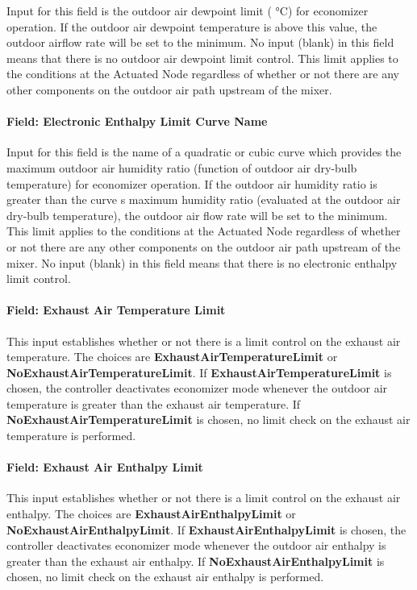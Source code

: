 Input for this field is the outdoor air dewpoint limit ( °C) for economizer operation. If the outdoor air dewpoint temperature is above this value, the outdoor airflow rate will be set to the minimum. No input (blank) in this field means that there is no outdoor air dewpoint limit control. This limit applies to the conditions at the Actuated Node regardless of whether or not there are any other components on the outdoor air path upstream of the mixer.

\paragraph{Field: Electronic Enthalpy Limit Curve Name}\label{field-electronic-enthalpy-limit-curve-name-1}

Input for this field is the name of a quadratic or cubic curve which provides the maximum outdoor air humidity ratio (function of outdoor air dry-bulb temperature) for economizer operation. If the outdoor air humidity ratio is greater than the curve s maximum humidity ratio (evaluated at the outdoor air dry-bulb temperature), the outdoor air flow rate will be set to the minimum. This limit applies to the conditions at the Actuated Node regardless of whether or not there are any other components on the outdoor air path upstream of the mixer. No input (blank) in this field means that there is no electronic enthalpy limit control.

\paragraph{Field: Exhaust Air Temperature Limit}\label{field-exhaust-air-temperature-limit}

This input establishes whether or not there is a limit control on the exhaust air temperature. The choices are \textbf{ExhaustAirTemperatureLimit} or \textbf{NoExhaustAirTemperatureLimit}. If \textbf{ExhaustAirTemperatureLimit} is chosen, the controller deactivates economizer mode whenever the outdoor air temperature is greater than the exhaust air temperature. If \textbf{NoExhaustAirTemperatureLimit} is chosen, no limit check on the exhaust air temperature is performed.

\paragraph{Field: Exhaust Air Enthalpy Limit}\label{field-exhaust-air-enthalpy-limit}

This input establishes whether or not there is a limit control on the exhaust air enthalpy. The choices are \textbf{ExhaustAirEnthalpyLimit} or \textbf{NoExhaustAirEnthalpyLimit}. If \textbf{ExhaustAirEnthalpyLimit} is chosen, the controller deactivates economizer mode whenever the outdoor air enthalpy is greater than the exhaust air enthalpy. If \textbf{NoExhaustAirEnthalpyLimit} is chosen, no limit check on the exhaust air enthalpy is performed.

